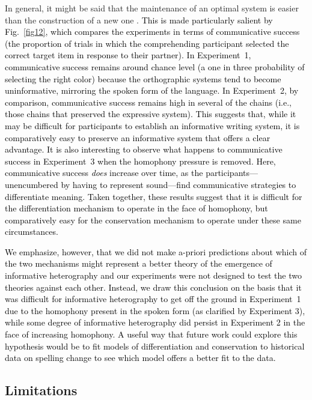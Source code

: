 \documentclass[doc,biblatex]{apa7}
\newcommand\firstrevision[1]{\textcolor{black}{#1}}
\newcommand\secondrevision[1]{\textcolor{black}{#1}}
\begin{document}
In general, it might be said that the maintenance of an optimal system is easier than the construction of a new one \parencite[see also][]{Smith:2002}. \firstrevision{This is made particularly salient by Fig.~\ref{fig12}, which compares the experiments in terms of communicative success (the proportion of trials in which the comprehending participant selected the correct target item in response to their partner). In Experiment~1, communicative success remains around chance level (a one in three probability of selecting the right color) because the orthographic systems tend to become uninformative, mirroring the spoken form of the language. In Experiment~2, by comparison, communicative success remains high in several of the chains (i.e., those chains that preserved the expressive system). This suggests that, while it may be difficult for participants to establish an informative writing system, it is comparatively easy to preserve an informative system that offers a clear advantage. It is also interesting to observe what happens to communicative success in Experiment~3 when the homophony pressure is removed. Here, communicative success \textit{does} increase over time, as the participants---unencumbered by having to represent sound---find communicative strategies to differentiate meaning. Taken together, these results suggest that it is difficult for the differentiation mechanism to operate in the face of homophony, but comparatively easy for the conservation mechanism to operate under these same circumstances.}

\secondrevision{We emphasize, however, that we did not make a-priori predictions about which of the two mechanisms might represent a better theory of the emergence of informative heterography and our experiments were not designed to test the two theories against each other. Instead, we draw this conclusion on the basis that it was difficult for informative heterography to get off the ground in Experiment~1 due to the homophony present in the spoken form (as clarified by Experiment 3), while some degree of informative heterography did persist in Experiment 2 in the face of increasing homophony. A useful way that future work could explore this hypothesis would be to fit models of differentiation and conservation to historical data on spelling change to see which model offers a better fit to the data.}

\subsection{Limitations}
\end{document}
